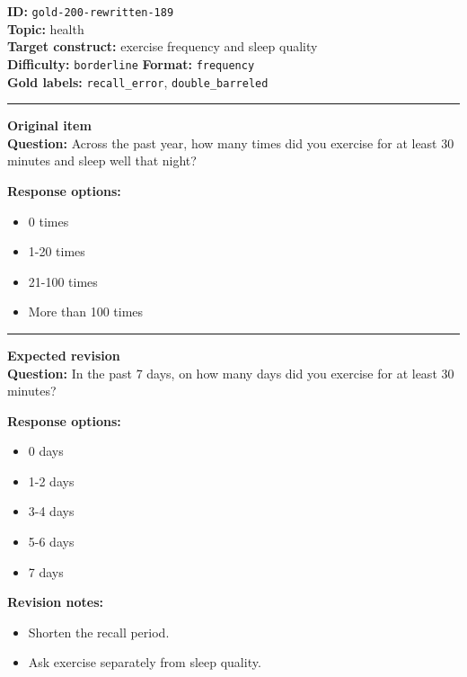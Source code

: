 \documentclass[10pt,a4paper]{article}
\newcommand{\sectionline}{\vspace{0.15em}\hrule\vspace{0.35em}}
\begin{document}
\begin{tcolorbox}[colframe=FlawRed,colback=white,colbacktitle=FlawRed!9,coltitle=black,title={Item 189\hfill Flawed item}]
\textbf{ID:} \texttt{gold-200-rewritten-189}\\
\textbf{Topic:} health\\
\textbf{Target construct:} exercise frequency and sleep quality\\
\textbf{Difficulty:} \texttt{borderline} \quad \textbf{Format:} \texttt{frequency}\\
\textbf{Gold labels:} \texttt{recall\_error}, \texttt{double\_barreled}\\
\sectionline
\textbf{Original item}\\
\textbf{Question:} Across the past year, how many times did you exercise for at least 30 minutes and sleep well that night?
\par\textbf{Response options:}
\begin{itemize}
\item 0 times
\item 1-20 times
\item 21-100 times
\item More than 100 times
\end{itemize}
\sectionline
\textbf{Expected revision}\\
\textbf{Question:} In the past 7 days, on how many days did you exercise for at least 30 minutes?
\par\textbf{Response options:}
\begin{itemize}
\item 0 days
\item 1-2 days
\item 3-4 days
\item 5-6 days
\item 7 days
\end{itemize}
\par\textbf{Revision notes:}
\begin{itemize}
\item Shorten the recall period.
\item Ask exercise separately from sleep quality.
\end{itemize}
\end{tcolorbox}
\end{document}
